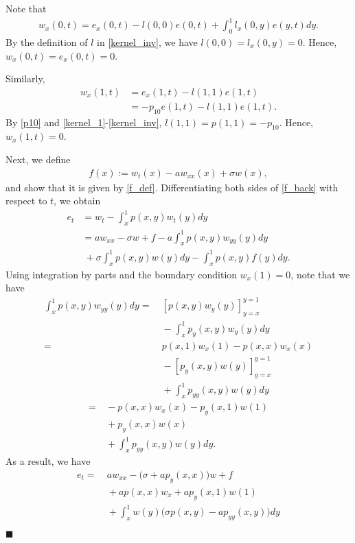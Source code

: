 \documentclass[twocolumn]{autart}
\newenvironment{proof}{{\it Proof. }}{\hfill $\blacksquare$ }
\begin{document}
\begin{proof}
Note that 
\begin{align*}
w_x(0,t) = e_x(0,t)-l(0,0)e(0,t)+\int_0^1l_x(0,y)e(y,t)dy.
\end{align*}
By the definition of $l$ in \eqref{kernel_inv}, we have $l(0,0)=l_x(0,y)=0$. Hence, $w_x(0,t)=e_x(0,t)=0$.  

Similarly, 
\begin{align*}
w_x(1,t) &= e_x(1,t) - l(1,1)e(1,t) \\
&= -p_{10}e(1,t)-l(1,1)e(1,t).
\end{align*}
By \eqref{p10} and \eqref{kernel_1}-\eqref{kernel_inv}, $l(1,1)=p(1,1)=-p_{10}$. Hence, $w_x(1,t)=0$. 

Next, we define
\begin{align*}
f(x) := w_t(x) - a w_{xx}(x)+\sigma w(x),
\end{align*}
and show that it is given by \eqref{f_def}. Differentiating both sides of \eqref{f_back} with respect to $t$, we obtain 
\begin{align*}
e_t&= w_t-\int_{x}^1p(x,y)w_t(y)dy \nonumber \\
&= aw_{xx}-\sigma w + f -a\int_{x}^1p(x,y)w_{yy}(y)dy \\
&~+ \sigma \int_{x}^1p(x,y)w(y)dy-\int_{x}^{1}p(x,y)f(y)dy. 
\end{align*}
Using integration by parts and the boundary condition $w_x(1)=0$, note that we have 
\begin{align*}
\int_{x}^1p(x,y)w_{yy}(y)dy =&~ \left[p(x,y)w_y(y)\right]_{y=x}^{y=1} \nonumber \\&~-\int_{x}^{1}p_y(x,y)w_y(y)dy \nonumber \\
=&~p(x,1)w_x(1)-p(x,x)w_x(x)  \nonumber \\
&~- \left[p_y(x,y)w(y) \right]_{y=x}^{y=1} \nonumber \\
&~+\int_{x}^1p_{yy}(x,y)w(y)dy \nonumber
\end{align*}
\begin{align*}
=&~ - p(x,x)w_x(x)-p_y(x,1)w(1) \nonumber \\
&~+p_y(x,x)w(x) \nonumber \\
&~+\int_{x}^1p_{yy}(x,y)w(y)dy. 
\end{align*}
As a result, we have
\begin{align*}
e_t =&~ aw_{xx}-\big(\sigma+ap_y(x,x)\big) w+f \nonumber \\
&~+ap(x,x)w_x+ap_y(x,1)w(1) \nonumber \\
&~+\int_{x}^1w(y) \big(\sigma p(x,y)-ap_{yy}(x,y)\big)dy\nonumber \\

\end{align*}
\end{proof}
\end{document}
